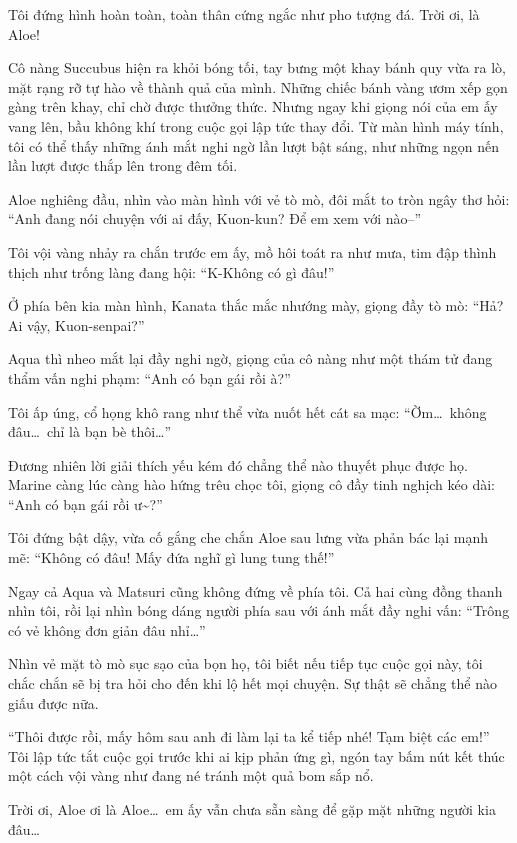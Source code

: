 \documentclass[../main.tex]{subfiles}
\begin{document}
Tôi đứng hình hoàn toàn, toàn thân cứng ngắc như pho tượng đá. Trời ơi, là Aloe!

Cô nàng Succubus hiện ra khỏi bóng tối, tay bưng một khay bánh quy vừa ra lò, mặt rạng rỡ tự hào về thành quả của mình. Những chiếc bánh vàng ươm xếp gọn gàng trên khay, chỉ chờ được thưởng thức. Nhưng ngay khi giọng nói của em ấy vang lên, bầu không khí trong cuộc gọi lập tức thay đổi. Từ màn hình máy tính, tôi có thể thấy những ánh mắt nghi ngờ lần lượt bật sáng, như những ngọn nến lần lượt được thắp lên trong đêm tối.

Aloe nghiêng đầu, nhìn vào màn hình với vẻ tò mò, đôi mắt to tròn ngây thơ hỏi: ``Anh đang nói chuyện với ai đấy, Kuon-kun? Để em xem với nào--''

Tôi vội vàng nhảy ra chắn trước em ấy, mồ hôi toát ra như mưa, tim đập thình thịch như trống làng đang hội: ``K-Không có gì đâu!''

Ở phía bên kia màn hình, Kanata thắc mắc nhướng mày, giọng đầy tò mò: ``Hả? Ai vậy, Kuon-senpai?''

Aqua thì nheo mắt lại đầy nghi ngờ, giọng của cô nàng như một thám tử đang thẩm vấn nghi phạm: ``Anh có bạn gái rồi à?''

Tôi ấp úng, cổ họng khô rang như thể vừa nuốt hết cát sa mạc: ``Ờm\dots\ không đâu\dots\ chỉ là bạn bè thôi\dots''

Đương nhiên lời giải thích yếu kém đó chẳng thể nào thuyết phục được họ. Marine càng lúc càng hào hứng trêu chọc tôi, giọng cô đầy tinh nghịch kéo dài: ``Anh có bạn gái rồi ư\~{}?''

Tôi đứng bật dậy, vừa cố gắng che chắn Aloe sau lưng vừa phản bác lại mạnh mẽ: ``Không có đâu! Mấy đứa nghĩ gì lung tung thế!''

Ngay cả Aqua và Matsuri cũng không đứng về phía tôi. Cả hai cùng đồng thanh nhìn tôi, rồi lại nhìn bóng dáng người phía sau với ánh mắt đầy nghi vấn: ``Trông có vẻ không đơn giản đâu nhỉ\dots''

Nhìn vẻ mặt tò mò sục sạo của bọn họ, tôi biết nếu tiếp tục cuộc gọi này, tôi chắc chắn sẽ bị tra hỏi cho đến khi lộ hết mọi chuyện. Sự thật sẽ chẳng thể nào giấu được nữa.

``Thôi được rồi, mấy hôm sau anh đi làm lại ta kể tiếp nhé! Tạm biệt các em!'' Tôi lập tức tắt cuộc gọi trước khi ai kịp phản ứng gì, ngón tay bấm nút kết thúc một cách vội vàng như đang né tránh một quả bom sắp nổ.

Trời ơi, Aloe ơi là Aloe\dots\ em ấy vẫn chưa sẵn sàng để gặp mặt những người kia đâu\dots
\end{document}
